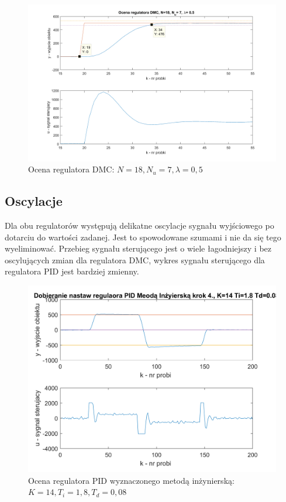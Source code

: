 \documentclass[a4paper, 10pt]{article}
\begin{document}
\begin{figure}[H]
	\centering
	\includegraphics[width=0.9\linewidth]{ocenaDMC}
	\caption{Ocena regulatora DMC: $N=18, N_{u}=7, \lambda=0,5$}
	\label{fig:ocenaDMC}
\end{figure}

\subsection{Oscylacje}
Dla obu regulatorów występują delikatne oscylacje sygnału wyjściowego po dotarciu do wartości zadanej. Jest to spowodowane szumami i nie da się tego wyeliminować. Przebieg sygnału sterującego jest o wiele łagodniejszy i bez oscylujących zmian dla regulatora DMC, wykres sygnału sterującego dla regulatora PID jest bardziej zmienny.

\begin{figure}[H]
	\centering
	\includegraphics[width=0.9\linewidth]{MI_11}
	\caption{Ocena regulatora PID wyznaczonego metodą inżynierską: $K=14, T_{i}=1,8, T_{d}=0,08$}
	\label{fig:MI_11_}
\end{figure}
\end{document}
